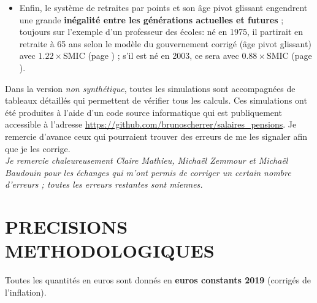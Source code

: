 \begin{itemize}
\item Enfin, le système de retraites par points et son âge pivot glissant engendrent une grande {\bf inégalité entre les générations actuelles et futures} ; toujours sur l'exemple d'un professeur des écoles: né en 1975, il partirait en retraite à 65 ans selon le modèle du gouvernement corrigé (âge pivot glissant) avec $1.22\times$SMIC (page \pageref{ProfEcoles_100_1975_22_0}) ; s'il est né en 2003, ce sera avec $0.88\times$SMIC (page \pageref{ProfEcoles_100_2003_22_0}).
\end{itemize}

\vspace{.2cm}

{\small
Dans la version \emph{non synthétique}, toutes les simulations sont accompagnées de tableaux détaillés qui permettent de vérifier tous les calculs. Ces simulations ont été produites à l'aide d'un code source informatique qui est publiquement accessible à l'adresse \url{https://github.com/brunoscherrer/salaires_pensions}. Je remercie d'avance ceux qui pourraient trouver des erreurs de me les signaler afin que je les corrige. \\
\emph{Je remercie chaleureusement Claire Mathieu, Michaël Zemmour et Michaël Baudouin pour les échanges qui m'ont permis de corriger un certain nombre d'erreurs ; toutes les erreurs restantes sont miennes.}
}

\newpage

{\small
\setcounter{tocdepth}{0}
\begingroup
\let\clearpage\relax
\tableofcontents
\endgroup
}

\chapter*{PRECISIONS METHODOLOGIQUES}
\label{modeles}

Toutes les quantités en euros sont donnés en {\bf euros constants 2019} (corrigés de l'inflation).

